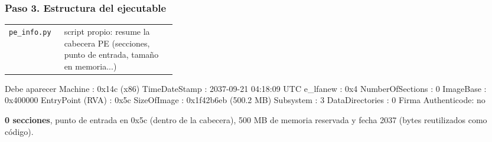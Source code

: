 \documentclass[11pt,a4paper]{article}
\begin{document}
\subsubsection*{Paso 3. Estructura del ejecutable}
\begin{tcolorbox}[enhanced, breakable, colback=gray!3, colframe=gray!35, boxrule=0.3pt, arc=1pt, left=4pt, right=4pt, top=2pt, bottom=2pt, fonttitle=\sffamily\scriptsize\bfseries, coltitle=black!70, colbacktitle=gray!10, title={Qué hace cada parte}, attach title to upper, before skip=2pt, after skip=4pt, fontupper=\small]
\par{\renewcommand{\arraystretch}{1.12}\begin{tabularx}{\linewidth}{@{}>{\raggedright\arraybackslash}p{0.33\linewidth}>{\raggedright\arraybackslash}X@{}}
\texttt{pe\_\allowbreak{}info.py} & script propio: resume la cabecera PE (secciones, punto de entrada, tamaño en memoria...) \\
\end{tabularx}}
\end{tcolorbox}
\begin{salida}{Debe aparecer}
Machine          : 0x14c  (x86)
TimeDateStamp    : 2037-09-21 04:18:09 UTC
e_lfanew         : 0x4
NumberOfSections : 0
ImageBase        : 0x400000
EntryPoint (RVA) : 0x5c
SizeOfImage      : 0x1f42b6eb  (500.2 MB)
Subsystem        : 3
DataDirectories  : 0
Firma Authenticode: no
\end{salida}
\begin{nota}\textbf{0 secciones}, punto de entrada en 0x5c (dentro de la cabecera), 500 MB de memoria reservada y fecha 2037 (bytes reutilizados como código).\end{nota}
\end{document}
